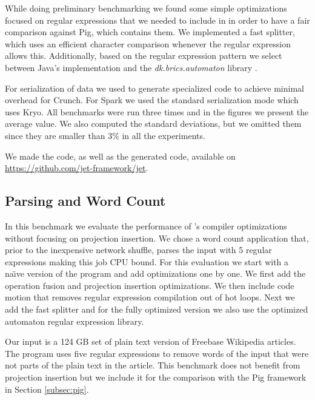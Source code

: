 While doing preliminary benchmarking we found some simple optimizations focused
on regular expressions that we needed to include in \tool in order to have a fair
comparison against Pig, which contains them. We implemented a fast splitter,
which uses an efficient character comparison whenever the regular expression
allows this. Additionally, based on the regular expression pattern we select
between Java's implementation and the \emph{dk.brics.automaton} library \cite{mollerdk}.

For serialization of data we used \tool to generate specialized code to achieve minimal overhead for Crunch. 
For Spark we used the standard serialization mode which uses Kryo. All
benchmarks were run three times and in the figures we present the average
value. We also computed the standard deviations, but we omitted them since they
are smaller than 3\% in all the experiments.

We made the \tool code, as well as the generated code, available on
\url{https://github.com/jet-framework/jet}.


\subsection{Parsing and Word Count}
\label{subsec:parsing-word-count}

In this benchmark we evaluate the performance of \tool's compiler optimizations
without focusing on projection insertion. We chose a word count application
that, prior to the inexpensive network shuffle, parses the input with 5 regular
expressions making this job CPU bound. For this evaluation we start with a
 na\"{\i}ve version of the program and add optimizations one by one. We first add
the operation fusion and projection insertion optimizations. We then include
code motion that removes regular expression compilation out of hot loops. Next
we add the fast splitter and for the fully optimized version we also use the
optimized automaton regular expression library.

Our input is a 124 GB set of plain text version of Freebase Wikipedia articles.
The program uses five regular expressions to remove words of the input that were
not parts of the plain text in the article. This benchmark does not benefit from
projection insertion but we include it for the comparison
with the Pig framework in Section \ref{subsec:pig}.

